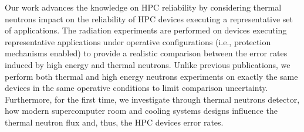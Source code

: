 Our work advances the knowledge on HPC reliability by considering thermal neutrons impact on the reliability of HPC devices executing a representative set of applications. The radiation experiments are performed on devices executing representative applications under operative configurations (i.e., protection mechanisms enabled) to provide a realistic comparison between the error rates induced by high energy and thermal neutrons. Unlike previous publications, we perform both thermal and high energy neutrons experiments on exactly the same devices in the same operative conditions to limit comparison uncertainty. Furthermore, for the first time, we investigate through thermal neutrons detector, how modern supercomputer room and cooling systems designs influence the thermal neutron flux and, thus, the HPC devices error rates.
